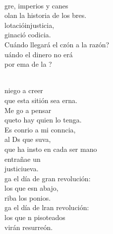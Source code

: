 \begin{cancion}%
	    \\
	gre, imperios y canes\\
	olan la historia de los bres.\\
	lotacióinjusticia,\\
	ginació codicia.\\
	Cuándo llegará el czón a la razón?\\
	uándo el dinero no erá \\
	por ema de la ? \\\jump\\
	\begin{chorus}%
	 niego a creer\\
	que esta sitión sea erna.\\
	Me go a pensar \\
	queto hay quien lo tenga.\\
	Es conrio a mi conncia,\\
	al Ds que suva,\\
	que ha insto en cada ser mano\\
	entrañae un\\
	justiciueva.   \\
	ga el día de gran revolución:\\
	los que esn abajo,  \\
	riba los ponios.\\
	ga el día de lran revolución:\\
	los que n pisoteados \\
	virán resurreón.\\
	\end{chorus}%
	\jump\\

\end{cancion}
